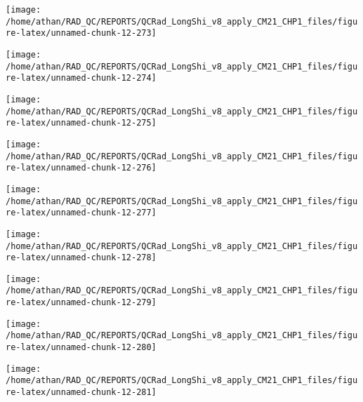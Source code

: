 \documentclass[
  10pt,
  a4paper,oneside]{article}
\begin{document}
\begin{center}\texttt{[image: /home/athan/RAD\_QC/REPORTS/QCRad\_LongShi\_v8\_apply\_CM21\_CHP1\_files/figure-latex/unnamed-chunk-12-273]} \end{center}

\begin{center}\texttt{[image: /home/athan/RAD\_QC/REPORTS/QCRad\_LongShi\_v8\_apply\_CM21\_CHP1\_files/figure-latex/unnamed-chunk-12-274]} \end{center}

\begin{center}\texttt{[image: /home/athan/RAD\_QC/REPORTS/QCRad\_LongShi\_v8\_apply\_CM21\_CHP1\_files/figure-latex/unnamed-chunk-12-275]} \end{center}

\begin{center}\texttt{[image: /home/athan/RAD\_QC/REPORTS/QCRad\_LongShi\_v8\_apply\_CM21\_CHP1\_files/figure-latex/unnamed-chunk-12-276]} \end{center}

\begin{center}\texttt{[image: /home/athan/RAD\_QC/REPORTS/QCRad\_LongShi\_v8\_apply\_CM21\_CHP1\_files/figure-latex/unnamed-chunk-12-277]} \end{center}

\begin{center}\texttt{[image: /home/athan/RAD\_QC/REPORTS/QCRad\_LongShi\_v8\_apply\_CM21\_CHP1\_files/figure-latex/unnamed-chunk-12-278]} \end{center}

\begin{center}\texttt{[image: /home/athan/RAD\_QC/REPORTS/QCRad\_LongShi\_v8\_apply\_CM21\_CHP1\_files/figure-latex/unnamed-chunk-12-279]} \end{center}

\begin{center}\texttt{[image: /home/athan/RAD\_QC/REPORTS/QCRad\_LongShi\_v8\_apply\_CM21\_CHP1\_files/figure-latex/unnamed-chunk-12-280]} \end{center}

\begin{center}\texttt{[image: /home/athan/RAD\_QC/REPORTS/QCRad\_LongShi\_v8\_apply\_CM21\_CHP1\_files/figure-latex/unnamed-chunk-12-281]} \end{center}
\end{document}
